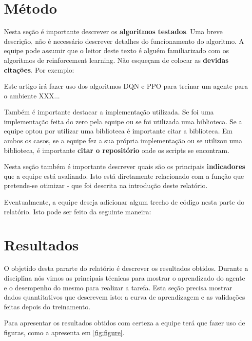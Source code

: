 \documentclass[9pt,a4paper,twoside]{tau}
\begin{document}
\section{Método}

Nesta seção é importante descrever os \textbf{algoritmos testados}. Uma breve descrição, não é necessário descrever detalhes do funcionamento do algoritmo. A equipe pode assumir que o leitor deste texto é alguém familiarizado com os algoritmos de reinforcement learning. Não esqueçam de colocar as \textbf{devidas citações}. Por exemplo:

\begin{info}[frametitle=Exemplo]
    Este artigo irá fazer uso dos algoritmos DQN \cite{mnih2013} e PPO \cite{schu2017} para treinar um agente para o ambiente XXX...
\end{info}

Também é importante destacar a implementação utilizada. Se foi uma implementação feita do zero pela equipe ou se foi utilizada uma biblioteca. Se a equipe optou por utilizar uma biblioteca é importante citar a biblioteca. Em ambos os casos, se a equipe fez a sua própria implementação ou se utilizou uma biblioteca, é importante \textbf{citar o repositório} onde os scripts se encontram.

Nesta seção também é importante descrever quais são os principais \textbf{indicadores} que a equipe está avaliando. Isto está diretamente relacionado com a função que pretende-se otimizar - que foi descrita na introdução deste relatório.

Eventualmente, a equipe deseja adicionar algum trecho de código nesta parte do relatório. Isto pode ser feito da seguinte maneira:



\section{Resultados}

O objetido desta pararte do relatório é descrever os resultados obtidos. Durante a disciplina nós vimos as principais técnicas para mostrar o aprendizado do agente e o desempenho do mesmo para realizar a tarefa. Esta seção precisa mostrar dados quantitativos que descrevem isto: a curva de aprendizagem e as validações feitas depois do treinamento.

Para apresentar os resultados obtidos com certeza a equipe terá que fazer uso de figuras, como a apresenta em \ref{fig:figure}.
\end{document}
